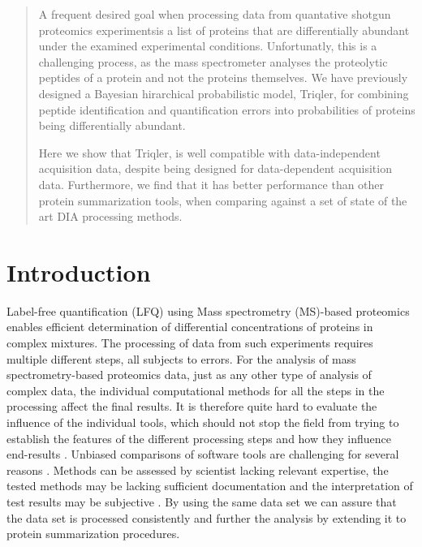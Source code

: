 \documentclass[10pt,letterpaper]{article}
\begin{document}
\maketitle



\begin{abstract}

A frequent desired goal when processing data from quantative shotgun proteomics experimentsis a list of proteins that are differentially abundant under the examined experimental conditions. Unfortunatly, this is a challenging process, as the mass spectrometer analyses the proteolytic peptides of a protein and not the proteins themselves. We have previously designed a Bayesian hirarchical probabilistic model, Triqler, for combining peptide identification and quantification errors into probabilities of proteins being differentially abundant. 

Here we show that Triqler, is well compatible with data-independent acquisition data, despite being designed for data-dependent acquisition data. Furthermore, we find that it has better performance than other protein summarization tools, when comparing against a set of state of the art DIA processing methods. 
\end{abstract}
  

\section*{Introduction}

Label-free quantification (LFQ) using Mass spectrometry (MS)-based proteomics enables efficient determination of differential concentrations of proteins in complex mixtures. The processing of data from such experiments requires multiple different steps, all subjects to errors. 
For the analysis of mass spectrometry-based proteomics data, just as any other type of analysis of complex data, the individual computational methods for all the steps in the processing affect the final results. It is therefore quite hard to evaluate the influence of the individual tools, which should not stop the field from trying to establish the features of the different processing steps and how they influence end-results \cite{dufresne2014abrf,gatto2016testing,navarro2016multicenter}. Unbiased comparisons of software tools are challenging for several reasons \cite{dufresne2014abrf}. Methods can be assessed by scientist lacking relevant expertise, the tested methods may be lacking sufficient documentation and the interpretation of test results may be subjective \cite{yates2012toward} \cite{leprevost2014best} \cite{pak2013clustering} \cite{faircomparison2015}. By using the same data set we can assure that the data set is processed consistently and further the analysis by extending it to protein summarization procedures.
\end{document}
